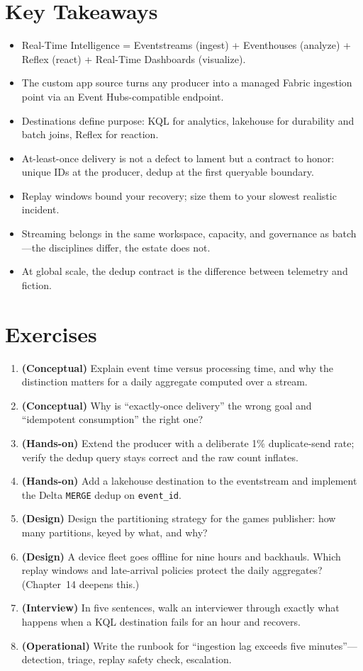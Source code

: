 \section*{Key Takeaways}
\begin{itemize}
    \item Real-Time Intelligence = Eventstreams (ingest) + Eventhouses (analyze) + Reflex (react) + Real-Time Dashboards (visualize).
    \item The custom app source turns any producer into a managed Fabric ingestion point via an Event Hubs-compatible endpoint.
    \item Destinations define purpose: KQL for analytics, lakehouse for durability and batch joins, Reflex for reaction.
    \item At-least-once delivery is not a defect to lament but a contract to honor: unique IDs at the producer, dedup at the first queryable boundary.
    \item Replay windows bound your recovery; size them to your slowest realistic incident.
    \item Streaming belongs in the same workspace, capacity, and governance as batch---the disciplines differ, the estate does not.
    \item At global scale, the dedup contract is the difference between telemetry and fiction.
\end{itemize}

\section{Exercises}
\begin{enumerate}
    \item \textbf{(Conceptual)} Explain event time versus processing time, and why the distinction matters for a daily aggregate computed over a stream.
    \item \textbf{(Conceptual)} Why is ``exactly-once delivery'' the wrong goal and ``idempotent consumption'' the right one?
    \item \textbf{(Hands-on)} Extend the producer with a deliberate 1\% duplicate-send rate; verify the dedup query stays correct and the raw count inflates.
    \item \textbf{(Hands-on)} Add a lakehouse destination to the eventstream and implement the Delta \texttt{MERGE} dedup on \texttt{event\_id}.
    \item \textbf{(Design)} Design the partitioning strategy for the games publisher: how many partitions, keyed by what, and why?
    \item \textbf{(Design)} A device fleet goes offline for nine hours and backhauls. Which replay windows and late-arrival policies protect the daily aggregates? (Chapter~14 deepens this.)
    \item \textbf{(Interview)} In five sentences, walk an interviewer through exactly what happens when a KQL destination fails for an hour and recovers.
    \item \textbf{(Operational)} Write the runbook for ``ingestion lag exceeds five minutes''---detection, triage, replay safety check, escalation.
\end{enumerate}

